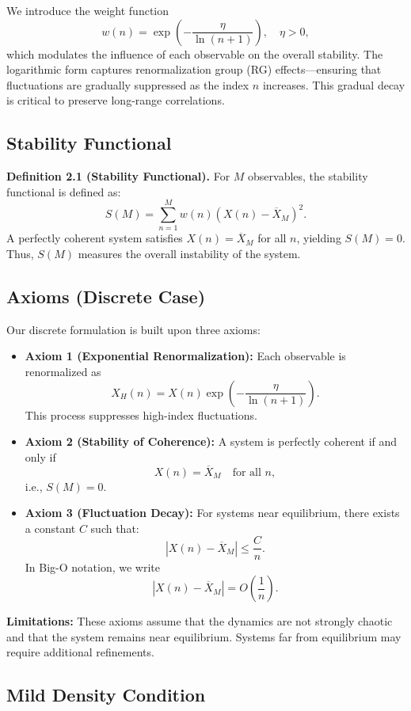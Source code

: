 \documentclass[11pt]{article}
\begin{document}
We introduce the weight function
\[
w(n)=\exp\left(-\frac{\eta}{\ln(n+1)}\right), \quad \eta>0,
\]
which modulates the influence of each observable on the overall stability. The logarithmic form captures renormalization group (RG) effects---ensuring that fluctuations are gradually suppressed as the index $n$ increases. This gradual decay is critical to preserve long-range correlations.

\subsection{Stability Functional}

\textbf{Definition 2.1 (Stability Functional).} For $M$ observables, the stability functional is defined as:
\[
S(M)=\sum_{n=1}^{M} w(n) \left( X(n)-\overline{X}_M \right)^2.
\]
A perfectly coherent system satisfies $X(n)=\overline{X}_M$ for all $n$, yielding $S(M)=0$. Thus, $S(M)$ measures the overall instability of the system.

\subsection{Axioms (Discrete Case)}

Our discrete formulation is built upon three axioms:
\begin{itemize}
    \item \textbf{Axiom 1 (Exponential Renormalization):} Each observable is renormalized as
    \[
    X_H(n)=X(n) \exp\left(-\frac{\eta}{\ln(n+1)}\right).
    \]
    This process suppresses high-index fluctuations.
    \item \textbf{Axiom 2 (Stability of Coherence):} A system is perfectly coherent if and only if
    \[
    X(n)=\overline{X}_M \quad \text{for all } n,
    \]
    i.e., $S(M)=0$.
    \item \textbf{Axiom 3 (Fluctuation Decay):} For systems near equilibrium, there exists a constant $C$ such that:
    \[
    \left| X(n)-\overline{X}_M \right| \le \frac{C}{n}.
    \]
    In Big-O notation, we write
    \[
    \left| X(n)-\overline{X}_M \right| = O\left(\frac{1}{n}\right).
    \]
\end{itemize}

\textbf{Limitations:} These axioms assume that the dynamics are not strongly chaotic and that the system remains near equilibrium. Systems far from equilibrium may require additional refinements.

\subsection{Mild Density Condition}
\end{document}
